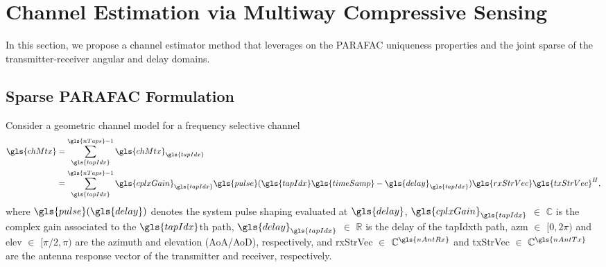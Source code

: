 \documentclass[conference]{IEEEtran}
\begin{document}
\section{Channel Estimation via Multiway Compressive Sensing}
\label{sec:multiway_cs}

In this section, we propose a channel estimator method that leverages on the
\gls{PARAFAC} uniqueness properties and the joint sparse of the transmitter-receiver
angular and delay domains. 


\subsection{Sparse \gls{PARAFAC} Formulation}
\label{sec:parafac_model}

Consider a geometric  channel model for a frequency selective channel
\begin{align}
  \label{eq:tap_model}
  \gls{chMtx} & = \sum_{\gls{tapIdx}}^{\gls{nTaps}-1}  \gls{chMtx}_{\gls{tapIdx}} \nonumber \\
              & = \sum_{\gls{tapIdx}}^{\gls{nTaps}-1}\gls{cplxGain}_{\gls{tapIdx}}\gls{pulse}(\gls{tapIdx}\gls{timeSamp} - \gls{delay}_{\gls{tapIdx}})\gls{rxStrVec}\gls{txStrVec}^H,
\end{align}
where $\gls{pulse}(\gls{delay})$
denotes the system pulse shaping evaluated at
$\gls{delay}$, $\gls{cplxGain}_{\gls{tapIdx}}$ $\in$ $\mathbb{C}$ is the complex
gain associated to the $\gls{tapIdx}$th path, $\gls{delay}_{\gls{tapIdx}}$ $\in$
$\mathbb{R}$ is the delay of the \gls{tapIdx}th path, \gls{azm} $\in$ $[0,2\pi)$
and \gls{elev} $\in$ $[\pi/2, \pi)$ are the azimuth and elevation (AoA/AoD),
respectively, and \gls{rxStrVec} $\in$ $\mathbb{C}^{\gls{nAntRx}}$ and
\gls{txStrVec} $\in$ $\mathbb{C}^{\gls{nAntTx}}$ are the antenna response vector
of the transmitter and receiver, respectively.
\end{document}
